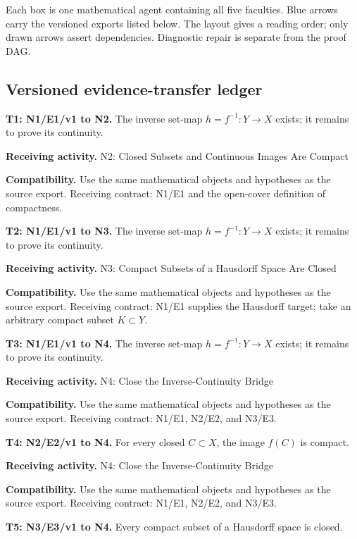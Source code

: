 \documentclass[preprint,12pt,aps,pra,showkeys,amsmath,amssymb,superscriptaddress,floatfix]{revtex4-2}
\theoremstyle{definition}
\theoremstyle{remark}
\newcommand{\field}[2]{\par\smallskip\noindent\textbf{#1.} #2\par}
\begin{document}
Each box is one mathematical agent containing all five faculties. Blue
arrows carry the versioned exports listed below. The layout gives a
reading order; only drawn arrows assert dependencies. Diagnostic repair
is separate from the proof DAG.

\clearpage\subsection{Versioned evidence-transfer ledger}

\begingroup\small\linespread{1.05}\selectfont

\field{T1: N1/E1/v1 to N2}{The inverse set-map \(h=f^{-1}:Y\to X\) exists; it remains to prove its
continuity.}

\field{Receiving activity}{N2: Closed Subsets and Continuous Images Are Compact}

\field{Compatibility}{Use the same mathematical objects and hypotheses as the source export.
Receiving contract: N1/E1 and the open-cover definition of compactness.}

\field{T2: N1/E1/v1 to N3}{The inverse set-map \(h=f^{-1}:Y\to X\) exists; it remains to prove its
continuity.}

\field{Receiving activity}{N3: Compact Subsets of a Hausdorff Space Are Closed}

\field{Compatibility}{Use the same mathematical objects and hypotheses as the source export.
Receiving contract: N1/E1 supplies the Hausdorff target; take an
arbitrary compact subset \(K\subset Y\).}

\field{T3: N1/E1/v1 to N4}{The inverse set-map \(h=f^{-1}:Y\to X\) exists; it remains to prove its
continuity.}

\field{Receiving activity}{N4: Close the Inverse-Continuity Bridge}

\field{Compatibility}{Use the same mathematical objects and hypotheses as the source export.
Receiving contract: N1/E1, N2/E2, and N3/E3.}

\field{T4: N2/E2/v1 to N4}{For every closed \(C\subset X\), the image \(f(C)\) is compact.}

\field{Receiving activity}{N4: Close the Inverse-Continuity Bridge}

\field{Compatibility}{Use the same mathematical objects and hypotheses as the source export.
Receiving contract: N1/E1, N2/E2, and N3/E3.}

\field{T5: N3/E3/v1 to N4}{Every compact subset of a Hausdorff space is closed.}
\end{document}
